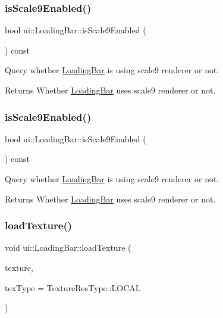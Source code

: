 \subsubsection{\texorpdfstring{is\+Scale9\+Enabled()}{isScale9Enabled()}\hspace{0.1cm}{\footnotesize\ttfamily [1/2]}}
{\footnotesize\ttfamily bool ui\+::\+Loading\+Bar\+::is\+Scale9\+Enabled (\begin{DoxyParamCaption}{ }\end{DoxyParamCaption}) const}



Query whether \hyperlink{classui_1_1LoadingBar}{Loading\+Bar} is using scale9 renderer or not. 

\begin{DoxyReturn}{Returns}
Whether \hyperlink{classui_1_1LoadingBar}{Loading\+Bar} uses scale9 renderer or not. 
\end{DoxyReturn}
\mbox{\label{classui_1_1LoadingBar_ad7069c89d7947232a990799256ebabf2}} 
\subsubsection{\texorpdfstring{is\+Scale9\+Enabled()}{isScale9Enabled()}\hspace{0.1cm}{\footnotesize\ttfamily [2/2]}}
{\footnotesize\ttfamily bool ui\+::\+Loading\+Bar\+::is\+Scale9\+Enabled (\begin{DoxyParamCaption}{ }\end{DoxyParamCaption}) const}



Query whether \hyperlink{classui_1_1LoadingBar}{Loading\+Bar} is using scale9 renderer or not. 

\begin{DoxyReturn}{Returns}
Whether \hyperlink{classui_1_1LoadingBar}{Loading\+Bar} uses scale9 renderer or not. 
\end{DoxyReturn}
\mbox{\label{classui_1_1LoadingBar_a72f581d7571f9e592ae91a73657a4862}} 
\subsubsection{\texorpdfstring{load\+Texture()}{loadTexture()}\hspace{0.1cm}{\footnotesize\ttfamily [1/2]}}
{\footnotesize\ttfamily void ui\+::\+Loading\+Bar\+::load\+Texture (\begin{DoxyParamCaption}\item[{const std\+::string \&}]{texture,  }\item[{\hyperlink{classui_1_1Widget_a040a65ec5ad3b11119b7e16b98bd9af0}{Texture\+Res\+Type}}]{tex\+Type = {\ttfamily TextureResType\+:\+:LOCAL} }\end{DoxyParamCaption})}

